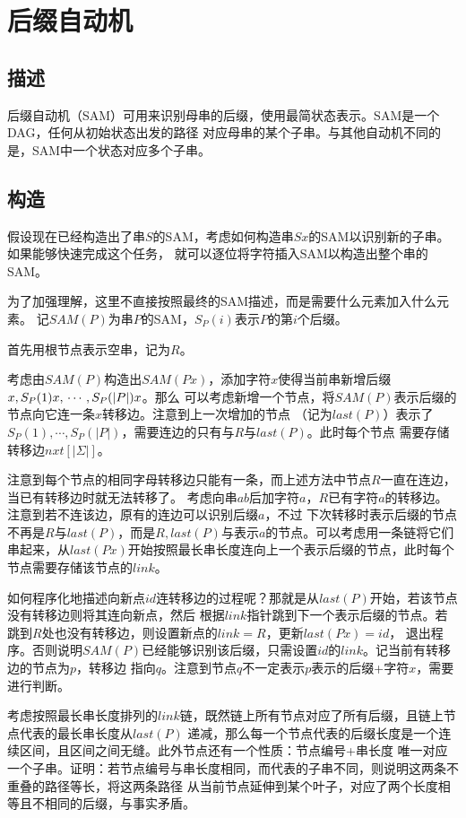 \section{后缀自动机}
\subsection{描述}
后缀自动机（SAM）可用来识别母串的后缀，使用最简状态表示。SAM是一个DAG，任何从初始状态出发的路径
对应母串的某个子串。与其他自动机不同的是，SAM中一个状态对应多个子串。

\subsection{构造}
假设现在已经构造出了串$S$的SAM，考虑如何构造串$Sx$的SAM以识别新的子串。如果能够快速完成这个任务，
就可以逐位将字符插入SAM以构造出整个串的SAM。

为了加强理解，这里不直接按照最终的SAM描述，而是需要什么元素加入什么元素。
记$SAM(P)$为串$P$的SAM，$S_P(i)$表示$P$的第$i$个后缀。

首先用根节点表示空串，记为$R$。

考虑由$SAM(P)$构造出$SAM(Px)$，添加字符$x$使得当前串新增后缀$x,S_P(1)x,\\\cdots,S_P(|P|)x$。那么
可以考虑新增一个节点，将$SAM(P)$表示后缀的节点向它连一条$x$转移边。注意到上一次增加的节点
（记为$last(P)$）表示了$S_P(1),\cdots,S_P(|P|)$，需要连边的只有与$R$与$last(P)$。此时每个节点
需要存储转移边$nxt[|\Sigma|]$。

注意到每个节点的相同字母转移边只能有一条，而上述方法中节点$R$一直在连边，当已有转移边时就无法转移了。
考虑向串$ab$后加字符$a$，$R$已有字符$a$的转移边。注意到若不连该边，原有的连边可以识别后缀$a$，不过
下次转移时表示后缀的节点不再是$R$与$last(P)$，而是$R,last(P)$与表示$a$的节点。可以考虑用一条链将它们
串起来，从$last(Px)$开始按照最长串长度连向上一个表示后缀的节点，此时每个节点需要存储该节点的$link$。

如何程序化地描述向新点$id$连转移边的过程呢？那就是从$last(P)$开始，若该节点没有转移边则将其连向新点，然后
根据$link$指针跳到下一个表示后缀的节点。若跳到$R$处也没有转移边，则设置新点的$link=R$，更新$last(Px)=id$，
退出程序。否则说明$SAM(P)$已经能够识别该后缀，只需设置$id$的$link$。记当前有转移边的节点为$p$，转移边
指向$q$。注意到节点$q$不一定表示$p$表示的后缀+字符$x$，需要进行判断。

考虑按照最长串长度排列的$link$链，既然链上所有节点对应了所有后缀，且链上节点代表的最长串长度从$last(P)$
递减，那么每一个节点代表的后缀长度是一个连续区间，且区间之间无缝。此外节点还有一个性质：节点编号+串长度
唯一对应一个子串。证明：若节点编号与串长度相同，而代表的子串不同，则说明这两条不重叠的路径等长，将这两条路径
从当前节点延伸到某个叶子，对应了两个长度相等且不相同的后缀，与事实矛盾。

